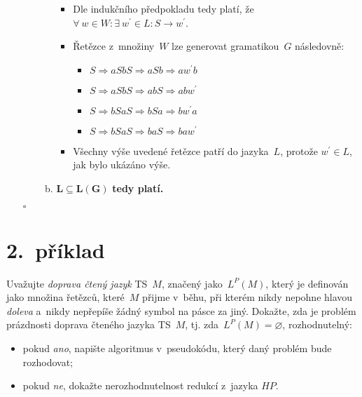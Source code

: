 \documentclass[a4paper, 11pt]{scrartcl}
\newcommand*{\QEDB}{\hfill\ensuremath{\square}}
\begin{document}
\begin{enumerate}[(a)]
\begin{enumerate}[i)]
\begin{enumerate}[a)]
\begin{itemize}[label=$ \bullet $]
								\item
									Dle indukčního předpokladu tedy platí,
									že $ \forall\ w \in W : \exists\
									w^\prime \in L : S \rightarrow
									w^\prime $.

								\item
									Řetězce z~množiny~$ W $ lze generovat
									gramatikou~$ G $ následovně:
									\begin{itemize}[label=]
										\item
											$ S \Rightarrow aSbS \Rightarrow
											aSb \Rightarrow aw^{\prime}b $

										\item
											$ S \Rightarrow aSbS \Rightarrow
											abS \Rightarrow abw^{\prime} $

										\item
											$ S \Rightarrow bSaS \Rightarrow
											bSa \Rightarrow bw^{\prime}a $

										\item
											$ S \Rightarrow bSaS \Rightarrow
											baS \Rightarrow baw^{\prime} $
									\end{itemize}

								\item
									Všechny výše uvedené řetězce patří do
									jazyka~$ L $, protože $ w^\prime \in L $,
									jak bylo ukázáno výše.
							\end{itemize}

						\item
							$ \boldsymbol{L \subseteq L(G)} $ \textbf{tedy
							platí.}
					\end{enumerate}
			\end{enumerate}
			\QEDB
	\end{enumerate}


	\section*{2.~příklad}

	Uvažujte \emph{doprava čtený jazyk} TS~$ M $, značený jako~$ L^P(M) $,
	který je definován jako množina řetězců, které~$ M $ přijme v~běhu, při
	kterém nikdy nepohne hlavou \emph{doleva} a~nikdy nepřepíše žádný symbol
	na pásce za jiný. Dokažte, zda je problém prázdnosti doprava čteného
	jazyka TS~$ M $, tj. zda~$ L^P(M) = \varnothing $, rozhodnutelný:
	\begin{itemize}
		\item
			pokud \emph{ano}, napište algoritmus v~pseudokódu, který daný
			problém bude rozhodovat;

		\item
			pokud \emph{ne}, dokažte nerozhodnutelnost redukcí z~jazyka
			$ HP $.
	\end{itemize}
\end{document}
